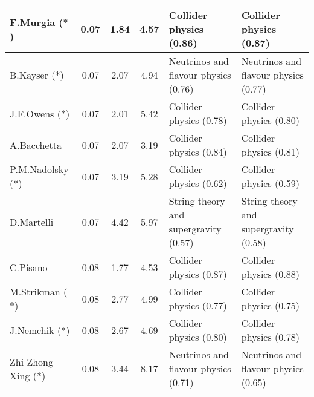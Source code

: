 \begin{table}
\begin{tabular}{p{}|c|c|c|b{}|b{}}
      F.Murgia ($\ast$) &  0.07 &          1.84 &          4.57 &               Collider physics (0.86) &               Collider physics (0.87)\\ \hline
      B.Kayser ($\ast$) &  0.07 &          2.07 &          4.94 &  Neutrinos and flavour physics (0.76) &  Neutrinos and flavour physics (0.77)\\ \hline
     J.F.Owens ($\ast$) &  0.07 &          2.01 &          5.42 &               Collider physics (0.78) &               Collider physics (0.80)\\ \hline
            A.Bacchetta &  0.07 &          2.07 &          3.19 &               Collider physics (0.84) &               Collider physics (0.81)\\ \hline
  P.M.Nadolsky ($\ast$) &  0.07 &          3.19 &          5.28 &               Collider physics (0.62) &               Collider physics (0.59)\\ \hline
             D.Martelli &  0.07 &          4.42 &          5.97 & String theory and supergravity (0.57) & String theory and supergravity (0.58)\\ \hline
               C.Pisano &  0.08 &          1.77 &          4.53 &               Collider physics (0.87) &               Collider physics (0.88)\\ \hline
    M.Strikman ($\ast$) &  0.08 &          2.77 &          4.99 &               Collider physics (0.77) &               Collider physics (0.75)\\ \hline
     J.Nemchik ($\ast$) &  0.08 &          2.67 &          4.69 &               Collider physics (0.80) &               Collider physics (0.78)\\ \hline
Zhi Zhong Xing ($\ast$) &  0.08 &          3.44 &          8.17 &  Neutrinos and flavour physics (0.71) &  Neutrinos and flavour physics (0.65)\\ \hline
\bottomrule
\end{tabular}
\end{table}
